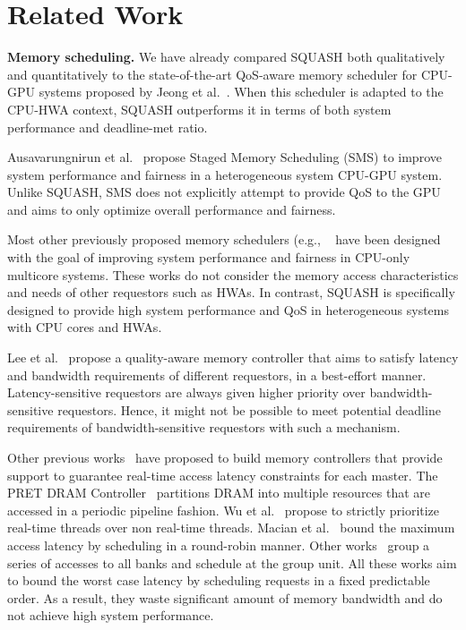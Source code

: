 \documentclass[10pt,letterpaper]{article}
\begin{document}
 
\section{Related Work}

\noindent\textbf{Memory scheduling.} We have already compared
SQUASH both qualitatively and quantitatively to the state-of-the-art QoS-aware
memory scheduler for CPU-GPU systems proposed by Jeong et
al.~\cite{schedulingCPUGPU}. When this scheduler is adapted to the CPU-HWA context,
SQUASH outperforms it in terms of both system performance and deadline-met ratio.

Ausavarungnirun et al.~\cite{sms} propose Staged Memory Scheduling (SMS) to
improve system performance and fairness in a heterogeneous system
CPU-GPU system. Unlike SQUASH, SMS does not explicitly attempt to provide QoS to the GPU and aims
to only optimize overall performance and fairness.

Most other previously proposed memory
schedulers (e.g., ~\cite{frfcfs,stfm,parbs,fqm,atlas,tcm,mise,Hur_micro2004} have been designed with
the goal of improving system performance and fairness in CPU-only multicore
systems. These works do not consider the memory access characteristics and needs
of other requestors such as HWAs. In contrast, SQUASH is specifically designed to provide high system
performance and QoS in heterogeneous systems with CPU cores and HWAs.

Lee et al.~\cite{Qware} propose a quality-aware memory controller that aims to
satisfy latency and bandwidth requirements of different requestors, in a
best-effort manner. Latency-sensitive requestors are always given higher
priority over bandwidth-sensitive requestors. Hence, it might not be possible to
meet potential deadline requirements of bandwidth-sensitive requestors with
such a mechanism.



Other previous works~\cite{predator,PRET,analyzable,timepred,beyond,Hyouseung_rtas2014} have
proposed to build memory controllers that provide support to guarantee
real-time access latency constraints for each master. The PRET DRAM
Controller~\cite{PRET} partitions DRAM into multiple resources that are
accessed in a periodic pipeline fashion. Wu et al.~\cite{timepred} propose to
strictly prioritize real-time threads over non real-time threads. Macian et
al.~\cite{beyond} bound the maximum access latency by scheduling in a
round-robin manner. Other works~\cite{predator,analyzable} group a series of accesses
to all banks and schedule at the group unit. All these works aim to bound
the worst case latency by scheduling requests in a fixed predictable order. As a result,
they waste significant amount of memory bandwidth and do not achieve high
system performance.
\end{document}
